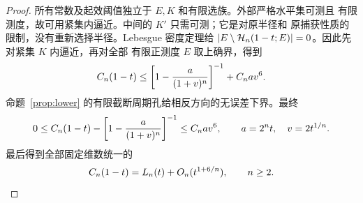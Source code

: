\begin{proof}
所有常数及起效阈值独立于 \(E,K\) 和有限选族。外部严格水平集可测且
有限测度，故可用紧集内逼近。中间的 \(K'\) 只需可测；它是对原半径和
原捕获性质的限制，没有重新选择半径。Lebesgue 密度定理给
\(|E\setminus\mathcal H_n(1-t;E)|=0\)。因此先对紧集 \(K\) 内逼近，再对全部
有限正测度 \(E\) 取上确界，得到
\[
 C_n(1-t)\le\left[1-\frac{a}{(1+v)^n}\right]^{-1}+C_nav^6.
\]
命题~\ref{prop:lower} 的有限截断周期孔给相反方向的无误差下界。最终
\[
 0\le C_n(1-t)-\left[1-\frac{a}{(1+v)^n}\right]^{-1}\le C_nav^6,
 \qquad a=2^nt,\quad v=2t^{1/n}.
\]
最后得到全部固定维数统一的
\[
 C_n(1-t)=L_n(t)+O_n(t^{1+6/n}),\qquad n\ge2.
\]
\end{proof}

